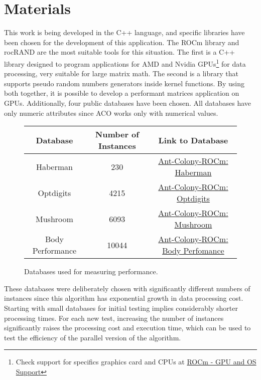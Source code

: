 \section{Materials} \label{Materials}

This work is being developed in the C++ language, and specific libraries have been chosen for the development of this application. The ROCm library\cite{rocm} and rocRAND\cite{rocrand} are the most suitable tools for this situation.
The first is a C++ library designed to program applications for AMD and Nvidia GPUs\footnote{Check support for specifics graphics card and CPUs at \href{https://rocm.docs.amd.com/en/latest/release/gpu_os_support.html}{ROCm - GPU and OS Support}} for data processing, very suitable for large matrix math.
The second is a library that supports pseudo random numbers generators inside kernel functions. By using both together, it is possible to develop a performant matrices application on GPUs.
Additionally, four public databases have been chosen. All databases have only numeric attributes since ACO works only with numerical values.

\begin{figure}
    \centering
    \begin{tabular}{|c|c|c|}
        \hline
        Database & Number of Instances & Link to Database \\
        \hline
        Haberman & 230 & \href{https://raw.githubusercontent.com/LucasSnatiago/Ant-Colony-ROCm/main/database/haberman_treino_normal.csv}{Ant-Colony-ROCm: Haberman} \\
        Optdigits & 4215 & \href{https://raw.githubusercontent.com/LucasSnatiago/Ant-Colony-ROCm/main/database/optdigits_treino_normal.csv}{Ant-Colony-ROCm: Optdigits} \\
        Mushroom & 6093 & \href{https://raw.githubusercontent.com/LucasSnatiago/Ant-Colony-ROCm/main/database/mushrooms_treino_normal.csv}{Ant-Colony-ROCm: Mushroom} \\
        Body Performance & 10044 & \href{https://raw.githubusercontent.com/LucasSnatiago/Ant-Colony-ROCm/main/database/body_performance_treino_normal.csv}{Ant-Colony-ROCm: Body Perfomance} \\
        \hline
    \end{tabular}
    \caption{Databases used for measuring performance.}
    \label{fig:datasets}
\end{figure}

These databases were deliberately chosen with significantly different numbers of instances since this algorithm has exponential growth in data processing cost. Starting with small databases for initial testing implies considerably shorter processing times. For each new test, increasing the number of instances significantly raises the processing cost and execution time, which can be used to test the efficiency of the parallel version of the algorithm.

